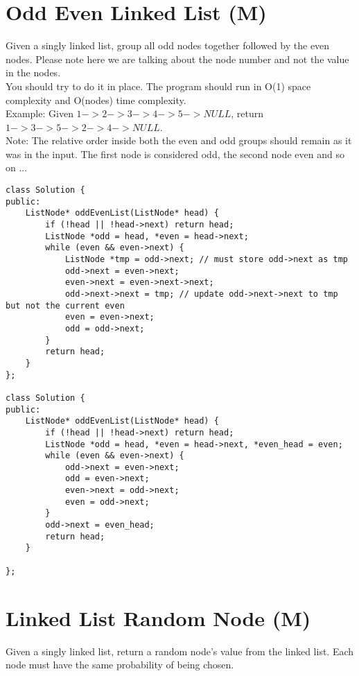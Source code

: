 \section{Odd Even Linked List (M)}
Given a singly linked list, group all odd nodes together followed by the even nodes. Please note here we are talking about the node number and not the value in the nodes.\\

You should try to do it in place. The program should run in O(1) space complexity and O(nodes) time complexity.\\

Example:
Given $1->2->3->4->5->NULL$, return $1->3->5->2->4->NULL$.\\

Note:
The relative order inside both the even and odd groups should remain as it was in the input.
The first node is considered odd, the second node even and so on ... \\

\begin{lstlisting}
class Solution {
public:
    ListNode* oddEvenList(ListNode* head) {
        if (!head || !head->next) return head;
        ListNode *odd = head, *even = head->next;
        while (even && even->next) {
            ListNode *tmp = odd->next; // must store odd->next as tmp
            odd->next = even->next;
            even->next = even->next->next;
            odd->next->next = tmp; // update odd->next->next to tmp but not the current even
            even = even->next;
            odd = odd->next;
        }
        return head;
    }
};

class Solution {
public:
    ListNode* oddEvenList(ListNode* head) {
        if (!head || !head->next) return head;
        ListNode *odd = head, *even = head->next, *even_head = even;
        while (even && even->next) {
            odd->next = even->next;
            odd = even->next;
            even->next = odd->next;
            even = odd->next;
        }
        odd->next = even_head;
        return head;
    }

};
\end{lstlisting}


\section{Linked List Random Node (M)}
Given a singly linked list, return a random node's value from the linked list. Each node must have the same probability of being chosen.\\

